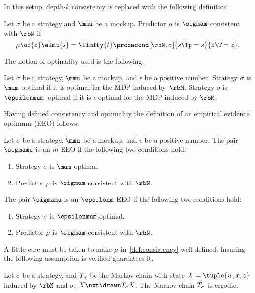 In this setup, depth-\(k\) consistency is replaced with the following definition.
\begin{definition}
\label{def:consistency}
Let \(\sigma\) be a strategy and \(\mmu\) be a mockup.
Predictor \(\mu\) is \(\sigmam\) consistent with \(\rbN\) if
\[
\mu \of{z} \elmt{s} = \limfty{t}\probacond[\rbN, \sigma]{s\Tp = s}{z\T = z}.
\]
\end{definition}

The notion of optimality used is the following.
\begin{definition}
Let \(\sigma\) be a strategy, \(\mmu\) be a mockup, and \(\epsilon\) be a positive number.
Strategy \(\sigma\) is \(\mum\) optimal if it is optimal for the MDP induced by~\(\rbM\).
Strategy \(\sigma\) is \(\epsilonmum\)~optimal if it is \(\epsilon\) optimal for the MDP induced by \(\rbM\).
\end{definition}

Having defined consistency and optimality the definition of an empirical evidence optimum~(EEO) follows.
\begin{definition}
Let \(\sigma\) be a strategy, \(\mmu\) be a mockup, and \(\epsilon\) be a positive number.
The pair \(\sigmamu\) is an \(m\) EEO if the following two conditions hold:
\begin{enumerate}
\item Strategy \(\sigma\) is \(\mum\) optimal.
\item Predictor \(\mu\) is \(\sigmam\) consistent with \(\rbN\).
\end{enumerate}
The pair \(\sigmamu\) is an \(\epsilonm\) EEO if the following two conditions hold:
\begin{enumerate}
\item Strategy \(\sigma\) is \(\epsilonmum\) optimal.
\item Predictor \(\mu\) is \(\sigmam\) consistent with \(\rbN\).
\end{enumerate}
\end{definition}

A little care must be taken to make \(\mu\) in~\cref{def:consistency} well defined.
Insuring the following assumption is verified guarantees it.
\begin{assumption}
\label{ass:ergodicity}
Let \(\sigma\) be a strategy, and \(T_{\sigma}\) be the Markov chain with state \(X = \tuple{w, x, z}\) induced by \(\rbN\) and \(\sigma\), \(X\nxt \drawn T\strat{\sigma} X\).
The Markov chain \(T_{\sigma}\) is ergodic.
\end{assumption}

